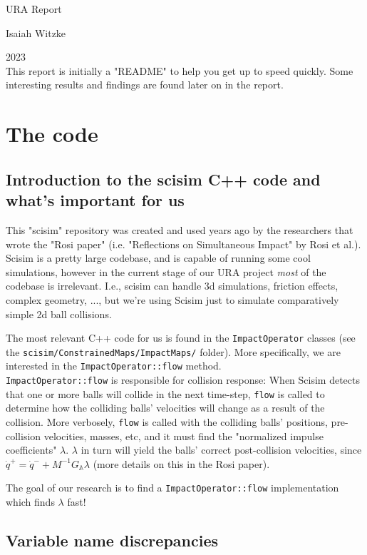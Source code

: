 \documentclass[12pt]{article}
\newcommand{\GA}{G_{\mathbb{A}}}
\begin{document}
URA Report

Isaiah Witzke

2023
\\

This report is initially a "README" to help you get up to speed quickly.
Some interesting results and findings are found later on in the report.

\section{The code}

\subsection{Introduction to the scisim C++ code and what's important for us}

This "scisim" repository was created and used years ago by the researchers that wrote the "Rosi paper"
(i.e. "Reflections on Simultaneous Impact" by Rosi et al.).
Scisim is a pretty large codebase, and is capable of running some cool simulations,
however in the current stage of our URA project \textit{most} of the codebase is irrelevant.
I.e., scisim can handle 3d simulations, friction effects, complex geometry, ...,
but we're using Scisim just to simulate comparatively simple 2d ball collisions.

The most relevant C++ code for us is found in the \texttt{ImpactOperator}
classes (see the \texttt{scisim/ConstrainedMaps/ImpactMaps/} folder).
More specifically, we are interested in the \texttt{ImpactOperator::flow} method.
\\\texttt{ImpactOperator::flow} is responsible for collision response:
When Scisim detects that one or more balls will collide in the next time-step, \texttt{flow} is called
to determine how the colliding balls' velocities will change as a result of the collision.
More verbosely, \texttt{flow} is called with the colliding balls' positions, pre-collision velocities, masses, etc,
and it must find the "normalized impulse coefficients" $\lambda$.
$\lambda$ in turn will yield the balls' correct post-collision velocities,
since $\dot{q}^+ = \dot{q}^- + M^{-1} \GA{} \lambda$ (more details on this in the Rosi paper).

The goal of our research is to find a \texttt{ImpactOperator::flow} implementation which finds $\lambda$ fast!

\subsection{Variable name discrepancies}
\end{document}

